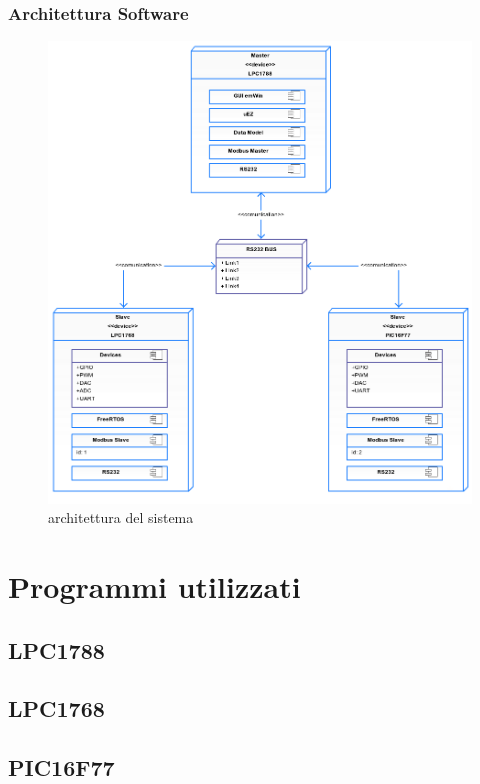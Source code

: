 \documentclass[a4paper,titlepage]{book}
\begin{document}
\subsection{Architettura Software}
\begin{figure}[!h]
\centering
\includegraphics[scale=0.3]{deploy.png}
\caption{architettura del sistema}



\end{figure}


\chapter{Programmi utilizzati}

\section{LPC1788}


\section{LPC1768}


\section{PIC16F77}
\end{document}

